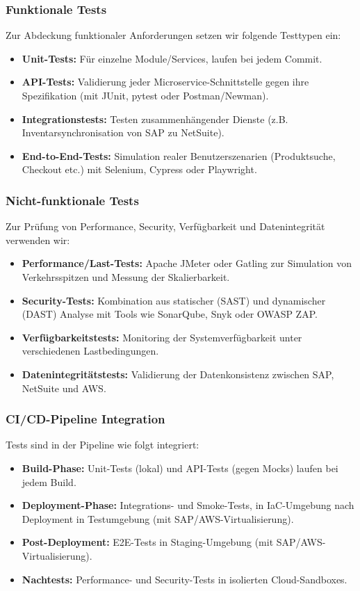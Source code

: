 \subsubsection{Funktionale Tests}

Zur Abdeckung funktionaler Anforderungen setzen wir folgende Testtypen ein:
\begin{itemize}
    \item \textbf{Unit-Tests:} Für einzelne Module/Services, laufen bei jedem Commit.
    \item \textbf{API-Tests:} Validierung jeder Microservice-Schnittstelle gegen ihre Spezifikation
    (mit JUnit, pytest oder Postman/Newman).
    \item \textbf{Integrationstests:} Testen zusammenhängender Dienste (z.B. Inventarsynchronisation
    von SAP zu NetSuite).
    \item \textbf{End-to-End-Tests:} Simulation realer Benutzerszenarien (Produktsuche, Checkout etc.)
    mit Selenium, Cypress oder Playwright.
\end{itemize}

\subsubsection{Nicht-funktionale Tests}
Zur Prüfung von Performance, Security, Verfügbarkeit und Datenintegrität verwenden wir:

\begin{itemize}
    \item \textbf{Performance/Last-Tests:} Apache JMeter oder Gatling zur Simulation von
    Verkehrsspitzen und Messung der Skalierbarkeit.
    \item \textbf{Security-Tests:} Kombination aus statischer (SAST) und dynamischer (DAST)
    Analyse mit Tools wie SonarQube, Snyk oder OWASP ZAP.
    \item \textbf{Verfügbarkeitstests:} Monitoring der Systemverfügbarkeit unter
    verschiedenen Lastbedingungen.
    \item \textbf{Datenintegritätstests:} Validierung der Datenkonsistenz zwischen SAP,
    NetSuite und AWS.
\end{itemize}

\subsubsection{CI/CD-Pipeline Integration}
Tests sind in der Pipeline wie folgt integriert:

\begin{itemize}
    \item \textbf{Build-Phase:} Unit-Tests (lokal) und API-Tests (gegen Mocks) laufen bei jedem Build.
    \item \textbf{Deployment-Phase:} Integrations- und Smoke-Tests, in IaC-Umgebung nach Deployment
    in Testumgebung (mit SAP/AWS-Virtualisierung).
    \item \textbf{Post-Deployment:} E2E-Tests in Staging-Umgebung (mit SAP/AWS-Virtualisierung).
    \item \textbf{Nachtests:} Performance- und Security-Tests in isolierten Cloud-Sandboxes.
\end{itemize}


